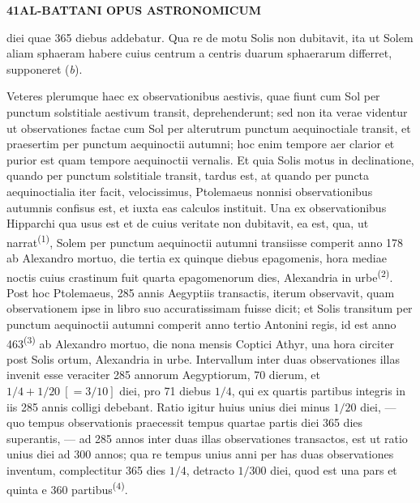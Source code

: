 \documentclass[10pt,a4paper]{article}
\newcommand{\SP}[3]{%
  \clearpage
  \hypertarget{AB01-PDF#1}{}%
  \begin{center}
    \textbf{#2\quad #3}
  \end{center}%
}
\newcommand{\A}[1]{\hypertarget{#1}{}}
\newcommand{\NM}[1]{\textsuperscript{(#1)}}
\begin{document}

\SP{0130}{41}{AL-BATTANI OPUS ASTRONOMICUM}

\A{AB01-PDF0130-P01}
diei quae 365 diebus addebatur. Qua re de motu Solis non dubitavit,
ita ut Solem aliam sphaeram habere cuius centrum a centris duarum
sphaerarum differret, supponeret ({\itshape b}).

\A{AB01-PDF0130-P02}
Veteres plerumque haec ex observationibus aestivis, quae fiunt cum
Sol per punctum solstitiale aestivum transit, deprehenderunt; sed
non ita verae videntur ut observationes factae cum Sol per
alterutrum punctum aequinoctiale transit, et praesertim per punctum
aequinoctii autumni; hoc enim tempore aer clarior et purior est quam
tempore aequinoctii vernalis. Et quia Solis motus in declinatione,
quando per punctum solstitiale transit, tardus est, at quando per
puncta aequinoctialia iter facit, velocissimus, Ptolemaeus nonnisi
observationibus autumnis confisus est, et iuxta eas calculos
instituit. Una ex observationibus Hipparchi qua usus est et de
cuius veritate non dubitavit, ea est, qua, ut narrat\NM{1}, Solem
per punctum aequinoctii autumni transiisse comperit anno 178 ab
Alexandro mortuo, die tertia ex quinque diebus epagomenis, hora
mediae noctis cuius crastinum fuit quarta epagomenorum dies,
Alexandria in urbe\NM{2}. Post hoc Ptolemaeus, 285 annis Aegyptiis
transactis, iterum observavit, quam observationem ipse in libro suo
accuratissimam fuisse dicit; et Solis transitum per punctum
aequinoctii autumni comperit anno tertio Antonini regis, id est
anno 463\NM{3} ab Alexandro mortuo, die nona mensis Coptici Athyr,
una hora circiter post Solis ortum, Alexandria in urbe. Intervallum
inter duas observationes illas invenit esse veraciter 285 annorum
Aegyptiorum, 70 dierum, et $1/4+1/20\ [=3/10]$ diei, pro 71 diebus
$1/4$, qui ex quartis partibus integris in iis 285 annis
colligi debebant. Ratio igitur huius unius diei minus
$1/20$ diei, --- quo tempus observationis praecessit tempus
quartae partis diei 365 dies superantis, --- ad 285 annos inter duas
illas observationes transactos, est ut ratio unius diei ad 300
annos; qua re tempus unius anni per has duas observationes
inventum, complectitur 365 dies $1/4$, detracto $1/300$ diei, quod
est una pars et quinta e 360 partibus\NM{4}.
\end{document}
